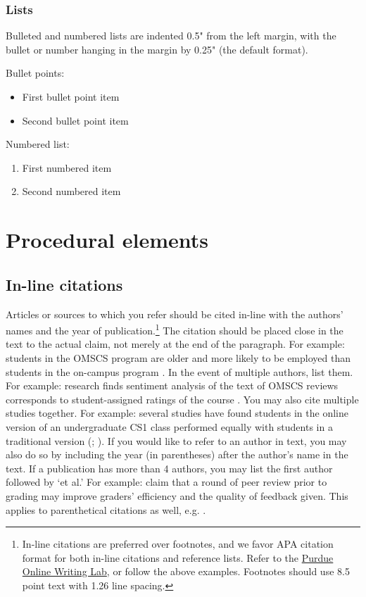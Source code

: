 \documentclass[
	letterpaper, %
]{jdf}
\begin{document}
\subsubsection{Lists}
Bulleted and numbered lists are indented 0.5" from the left margin, with the bullet or number hanging in the margin by 0.25" (the default format).

Bullet points:

\begin{itemize}
	\item First bullet point item
	\item Second bullet point item
\end{itemize}

Numbered list:

\begin{enumerate}
	\item First numbered item
	\item Second numbered item
\end{enumerate}

\section{Procedural elements}
\subsection{In-line citations}
Articles or sources to which you refer should be cited in-line with the authors’ names and the year of publication.\footnote{In-line citations are preferred over footnotes, 
and we favor APA citation format for both in-line citations and reference lists. Refer to the 
\href{https://owl.purdue.edu/owl/research_and_citation/apa_style/apa_formatting_and_style_guide/in_text_citations_the_basics.html}{Purdue Online Writing Lab}, or 
follow the above examples. Footnotes should use 8.5 point text with 1.26 line spacing.} The citation should be placed close in the text to the actual claim, not merely 
at the end of the paragraph. For example: students in the OMSCS program are older and more likely to be employed than students in the on-campus program \citep{joyner2017}. 
In the event of multiple authors, list them. For example: research finds sentiment analysis of the text of OMSCS reviews corresponds to student-assigned ratings of the 
course \citep{newman2018}. You may also cite multiple studies together. For example: several studies have found students in the online version of an undergraduate CS1 class 
performed equally with students in a traditional version (\cite{joyner2018a}; \cite{joyner2018b}). If you would like to refer to an author in text, you may also do so by 
including the year (in parentheses) after the author’s name in the text. If a publication has more than 4 authors, you may list the first author followed by ‘et al.’ For 
example:  claim that a round of peer review prior to grading may improve graders’ efficiency and the quality of feedback given. This applies to parenthetical 
citations as well, e.g. \citep{joyner2016}.
\end{document}
